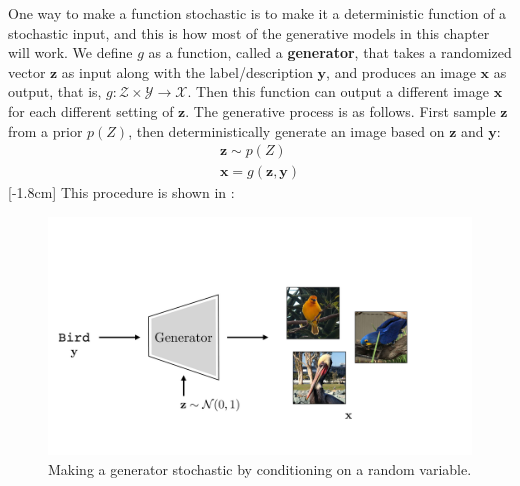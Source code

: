 One way to make a function stochastic is to make it a deterministic function of a stochastic input, and this is how most of the generative models in this chapter will work. We define $g$ as a function, called a \textbf{generator}, that takes a randomized vector $\mathbf{z}$ as input along with the label/description $\mathbf{y}$, and produces an image $\mathbf{x}$ as output, that is, $g: \mathcal{Z} \times \mathcal{Y} \rightarrow \mathcal{X}$. Then this function can output a different image $\mathbf{x}$ for each different setting of $\mathbf{z}$. The generative process is as follows. First sample $\mathbf{z}$ from a prior $p(Z)$, then deterministically generate an image based on $\mathbf{z}$ and $\mathbf{y}$:
\begin{align}
    \mathbf{z} \sim p(Z)\\
    \mathbf{x} = g(\mathbf{z},\mathbf{y})
\end{align}
[-1.8cm]
This procedure is shown in \fig{\ref{fig:generative_models:image_generation_with_z}}:
\begin{figure}[h]
    \centerline{
    \hspace*{0.1\linewidth}\includegraphics[width=0.7\linewidth]{./figures/generative_models/image_generation_with_z_birds.pdf}
    }
    \caption{Making a generator stochastic by conditioning on a random variable.}
    \label{fig:generative_models:image_generation_with_z}
\end{figure}

